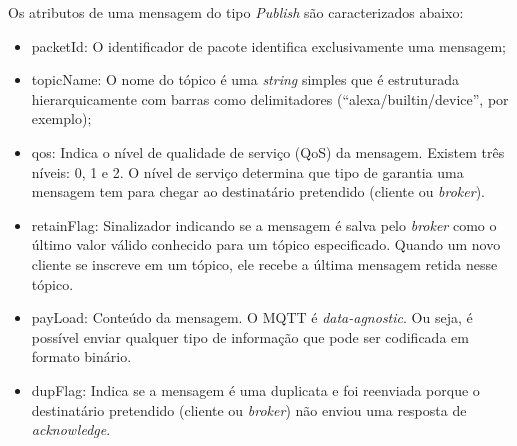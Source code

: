 \documentclass[
    12pt,
    openright,
    twoside,
    a4paper,
    english,
    spanish,
    brazil,
    ]{abntex2}
\begin{document}
Os atributos de uma mensagem do tipo \textit{Publish} são caracterizados abaixo:
\begin{itemize}
	\item packetId: O identificador de pacote identifica exclusivamente uma mensagem;
	\item topicName: O nome do tópico é uma \textit{string} simples que é estruturada hierarquicamente com barras como delimitadores (“alexa/builtin/device”, por exemplo);
	\item qos: Indica o nível de qualidade de serviço (QoS) da mensagem. Existem três níveis: 0, 1 e 2. O nível de serviço determina que tipo de garantia uma mensagem tem para chegar ao destinatário pretendido (cliente ou \textit{broker}).
	\item retainFlag: Sinalizador indicando se a mensagem é salva pelo \textit{broker} como o último valor válido conhecido para um tópico especificado. Quando um novo cliente se inscreve em um tópico, ele recebe a última mensagem retida nesse tópico.
	\item payLoad: Conteúdo  da mensagem. O MQTT é \textit{data-agnostic}. Ou seja, é possível enviar qualquer tipo de informação que pode ser codificada em formato binário.
	\item dupFlag: Indica se a mensagem é uma duplicata e foi reenviada porque o destinatário pretendido (cliente ou \textit{broker}) não enviou uma resposta de \textit{acknowledge}.
\end{itemize}

\end{document}
